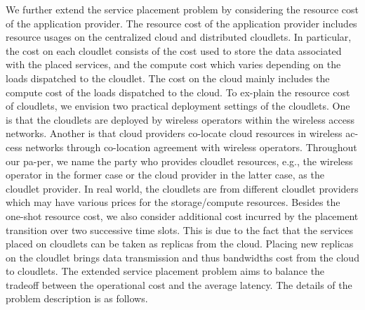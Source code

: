We further extend the service placement problem by considering the resource cost of the application provider. The resource cost of the application provider includes resource usages on the centralized cloud and distributed cloudlets. In particular, the cost on each cloudlet consists of the cost used to store the data associated with the placed services, and the compute cost which varies depending on the loads dispatched to the cloudlet. The cost on the cloud mainly includes the compute cost of the loads dispatched to the cloud. To ex-plain the resource cost of cloudlets, we envision two practical deployment settings of the cloudlets. One is that the cloudlets are deployed by wireless operators within the wireless access networks. Another is that cloud providers co-locate cloud resources in wireless ac-cess networks through co-location agreement with wireless operators. Throughout our pa-per, we name the party who provides cloudlet resources, e.g., the wireless operator in the former case or the cloud provider in the latter case, as the cloudlet provider. In real world, the cloudlets are from different cloudlet providers which may have various prices for the storage/compute resources. Besides the one-shot resource cost, we also consider additional cost incurred by the placement transition over two successive time slots. This is due to the fact that the services placed on cloudlets can be taken as replicas from the cloud. Placing new replicas on the cloudlet brings data transmission and thus bandwidths cost from the cloud to cloudlets. The extended service placement problem aims to balance the tradeoff between the operational cost and the average latency. The details of the problem description is as follows. 